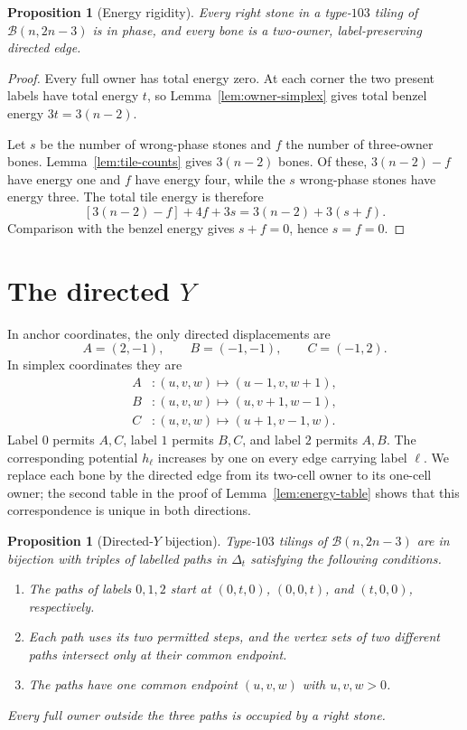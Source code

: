\documentclass[11pt]{amsart}
\newtheorem{proposition}[theorem]{Proposition}
\theoremstyle{definition}
\newcommand{\Bz}{\mathcal B}
\begin{document}
\begin{proposition}[Energy rigidity]\label{prop:energy-rigidity}
Every right stone in a type-$103$ tiling of $\Bz(n,2n-3)$ is in phase, and
every bone is a two-owner, label-preserving directed edge.
\end{proposition}

\begin{proof}
Every full owner has total energy zero.  At each corner the two present labels
have total energy $t$, so Lemma~\ref{lem:owner-simplex} gives total benzel
energy $3t=3(n-2)$.

Let $s$ be the number of wrong-phase stones and $f$ the number of three-owner
bones.  Lemma~\ref{lem:tile-counts} gives $3(n-2)$ bones.  Of these,
$3(n-2)-f$ have energy one and $f$ have energy four, while the $s$
wrong-phase stones have energy three.  The total tile energy is therefore
\[
 [3(n-2)-f]+4f+3s=3(n-2)+3(s+f).
\]
Comparison with the benzel energy gives $s+f=0$, hence $s=f=0$.
\end{proof}

\section{The directed \texorpdfstring{$Y$}{Y}}

In anchor coordinates, the only directed displacements are
\[
 A=(2,-1),\qquad B=(-1,-1),\qquad C=(-1,2).
\]
In simplex coordinates they are
\begin{align*}
 A&:(u,v,w)\longmapsto(u-1,v,w+1),\\
 B&:(u,v,w)\longmapsto(u,v+1,w-1),\\
 C&:(u,v,w)\longmapsto(u+1,v-1,w).
\end{align*}
Label $0$ permits $A,C$, label $1$ permits $B,C$, and label $2$ permits
$A,B$.  The corresponding potential $h_\ell$ increases by one on every
edge carrying label $\ell$.  We replace each bone by the directed edge from
its two-cell owner to its one-cell owner; the second table in the proof of
Lemma~\ref{lem:energy-table} shows that this correspondence is unique in both
directions.

\begin{proposition}[Directed-$Y$ bijection]\label{prop:Y-bijection}
Type-$103$ tilings of $\Bz(n,2n-3)$ are in bijection with triples of labelled
paths in $\Delta_t$ satisfying the following conditions.
\begin{enumerate}
\item The paths of labels $0,1,2$ start at $(0,t,0)$, $(0,0,t)$, and
      $(t,0,0)$, respectively.
\item Each path uses its two permitted steps, and the vertex sets of two
      different paths intersect only at their common endpoint.
\item The paths have one common endpoint $(u,v,w)$ with $u,v,w>0$.
\end{enumerate}
Every full owner outside the three paths is occupied by a right stone.
\end{proposition}
\end{document}
